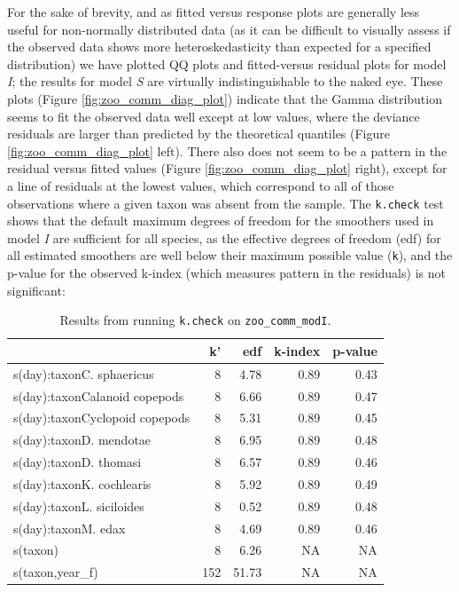 \documentclass[12pt]{article}
\begin{document}
For the sake of brevity, and as fitted versus response plots are
generally less useful for non-normally distributed data (as it can be
difficult to visually assess if the observed data shows more
heteroskedasticity than expected for a specified distribution) we have
plotted QQ plots and fitted-versus residual plots for model \emph{I};
the results for model \emph{S} are virtually indistinguishable to the
naked eye. These plots (Figure \ref{fig:zoo_comm_diag_plot}) indicate
that the Gamma distribution seems to fit the observed data well except
at low values, where the deviance residuals are larger than predicted by
the theoretical quantiles (Figure \ref{fig:zoo_comm_diag_plot} left).
There also does not seem to be a pattern in the residual versus fitted
values (Figure \ref{fig:zoo_comm_diag_plot} right), except for a line of
residuals at the lowest values, which correspond to all of those
observations where a given taxon was absent from the sample. The
\texttt{k.check} test shows that the default maximum degrees of freedom
for the smoothers used in model \emph{I} are sufficient for all species,
as the effective degrees of freedom (edf) for all estimated smoothers
are well below their maximum possible value
(\texttt{k\textquotesingle{}}), and the p-value for the observed k-index
(which measures pattern in the residuals) is not significant:

\begin{table}[t]

\caption{\label{tab:zoo_comm_check_k_kable}Results from running \texttt{k.check} on \texttt{zoo\_comm\_modI}.}
\centering
\begin{tabular}{lrrrr}
\toprule
  & k' & edf & k-index & p-value\\
\midrule
s(day):taxonC. sphaericus & 8 & 4.78 & 0.89 & 0.43\\
s(day):taxonCalanoid copepods & 8 & 6.66 & 0.89 & 0.47\\
s(day):taxonCyclopoid copepods & 8 & 5.31 & 0.89 & 0.45\\
s(day):taxonD. mendotae & 8 & 6.95 & 0.89 & 0.48\\
s(day):taxonD. thomasi & 8 & 6.57 & 0.89 & 0.46\\
\addlinespace
s(day):taxonK. cochlearis & 8 & 5.92 & 0.89 & 0.49\\
s(day):taxonL. siciloides & 8 & 0.52 & 0.89 & 0.48\\
s(day):taxonM. edax & 8 & 4.69 & 0.89 & 0.46\\
s(taxon) & 8 & 6.26 & NA & NA\\
s(taxon,year\_f) & 152 & 51.73 & NA & NA\\
\bottomrule
\end{tabular}
\end{table}
\end{document}
